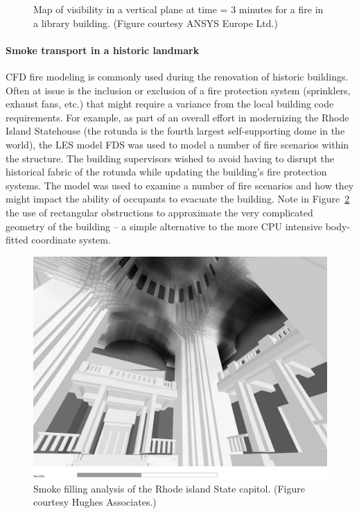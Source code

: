 \documentclass[graybox]{svmult}
\begin{document}
\begin{figure}[b]
\caption{Map of visibility in a vertical plane at time = 3 minutes for a fire in a library building. (Figure courtesy ANSYS Europe Ltd.)}
\label{ANSYS}
\end{figure}

\paragraph{Smoke transport in a historic landmark}

CFD fire modeling is commonly used during the renovation of historic buildings. Often at issue is the inclusion or exclusion of a fire protection system (sprinklers, exhaust fans, etc.) that might require a variance from the local building code requirements. For example, as part of an overall effort in modernizing the Rhode Island Statehouse (the rotunda is the fourth largest self-supporting dome in the world), the LES model FDS was used to model a number of fire scenarios within the structure. The building supervisors wished to avoid having to disrupt the historical fabric of the rotunda while updating the building's fire protection systems. The model was used to examine a number of fire scenarios and how they might impact the ability of occupants to evacuate the building. Note in Figure~\ref{Dome} the use of rectangular obstructions to approximate the very complicated geometry of the building -- a simple alternative to the more CPU intensive body-fitted coordinate system.

\begin{figure}[ht]
\includegraphics[width=\textwidth]{state_house}
\caption{Smoke filling analysis of the Rhode island State capitol. (Figure courtesy Hughes Associates.)}
\label{Dome}
\end{figure}
\end{document}
